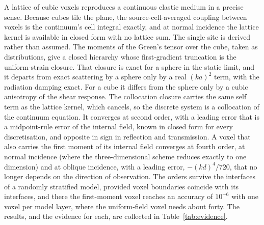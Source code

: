 \documentclass[extra,mreferee]{gji}
\begin{document}
A lattice of cubic voxels reproduces a continuous elastic medium in a precise sense. Because cubes
tile the plane, the source-cell-averaged coupling between voxels is the continuum's cell integral
exactly, and at normal incidence the lattice kernel is available in closed form with no lattice sum.
The single site is derived rather than assumed. The moments of the Green's tensor over the cube,
taken as distributions, give a closed hierarchy whose first-gradient truncation is the
uniform-strain closure. That closure is exact for a sphere in the static limit, and it departs from
exact scattering by a sphere only by a real $(ka)^2$ term, with the radiation damping exact. For a
cube it differs from the sphere only by a cubic anisotropy of the shear response.
The collocation closure carries the same self term as the lattice kernel, which cancels, so the discrete
system is a collocation of the continuum equation. It converges at second order, with a leading
error that is a midpoint-rule error of the internal field, known in closed form for every
discretisation, and opposite in sign in reflection and transmission. A voxel that also carries the
first moment of its internal field converges at fourth order, at normal incidence (where the
three-dimensional scheme reduces exactly to one dimension) and at oblique incidence, with a
leading error, $-(kd)^4/720$, that no longer depends on the direction of observation. The orders survive
the interfaces of a randomly stratified model, provided voxel boundaries coincide with its interfaces, and there the
first-moment voxel reaches an accuracy of $10^{-6}$ with one voxel per model layer, where the uniform-field
voxel needs about forty. The results, and the evidence for each, are collected in Table~\ref{tab:evidence}.
\end{document}
